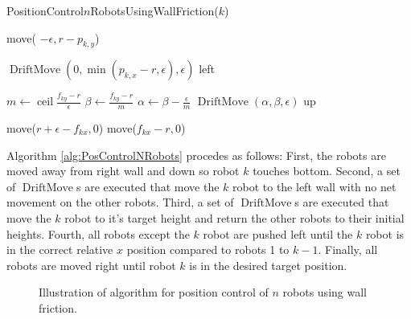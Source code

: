 \begin{algorithm}
\caption{PositionControl$n$RobotsUsingWallFriction($k$)}\label{alg:PosControlNRobots}
\begin{algorithmic}[1]
\State move( $-\epsilon, r-p_{k,y}$) %


\State $\operatorname{DriftMove}(0, \min(p_{k,x} - r,\epsilon), \epsilon)$ left   %
\EndWhile

\State $m \gets \operatorname{ceil}\frac{f_{ky}-r}{\epsilon}$
\State $\beta \gets \frac{f_{ky}-r}{m}$
\State $\alpha \gets \beta - \frac{\epsilon}{m}$
\State $\operatorname{DriftMove}(\alpha, \beta, \epsilon)$ up   %
\EndFor

\State move($r+\epsilon-f_{kx}, 0$)  %
\State move($f_{kx}-r, 0$)  

\end{algorithmic}
\end{algorithm}
Algorithm \ref{alg:PosControlNRobots} procedes as follows:  
First, the robots are moved  away from right wall and down so robot $k$ touches bottom.
Second, a set of $\operatorname{DriftMove}$s are executed that  move the $k$ robot to the left wall with no net movement on the other robots.
Third, a set of $\operatorname{DriftMove}$s are executed that  move the $k$ robot to it's target height and return the other robots to their initial heights. 
Fourth, all robots except the $k$ robot are pushed left until the $k$ robot is in the correct relative $x$ position compared to robots 1 to $k-1$.
Finally, all robots are moved right until robot $k$ is in the desired target position.
\begin{figure}
\begin{center}
\end{center}
\caption{\label{fig:construction2d}
Illustration of algorithm for position control of $n$ robots using wall friction.
}
\end{figure}













